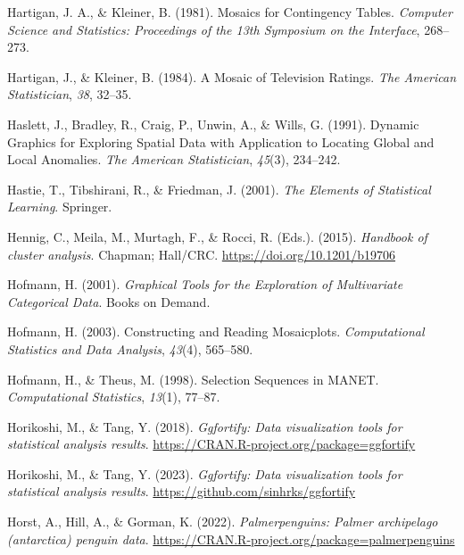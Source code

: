 \documentclass[
  letterpaper,
]{krantz}
\newlength{\cslhangindent}
\newlength{\cslentryspacingunit} %
\newenvironment{CSLReferences}[2] %
 {%
  \setlength{\parindent}{0pt}
  \ifodd #1
  \let\oldpar\par
  \def\par{\hangindent=\cslhangindent\oldpar}
  \fi
  \setlength{\parskip}{#2\cslentryspacingunit}
 }%
 {}
\begin{document}
\begin{CSLReferences}{1}{0}
\leavevmode{}%
Hartigan, J. A., \& Kleiner, B. (1981). Mosaics for {C}ontingency
{T}ables. \emph{Computer Science and Statistics: Proceedings of the 13th
Symposium on the Interface}, 268--273.

\leavevmode{}%
Hartigan, J., \& Kleiner, B. (1984). A {M}osaic of {T}elevision
{R}atings. \emph{The American Statistician}, \emph{38}, 32--35.

\leavevmode{}%
Haslett, J., Bradley, R., Craig, P., Unwin, A., \& Wills, G. (1991).
{D}ynamic {G}raphics for {E}xploring {S}patial {D}ata with {A}pplication
to {L}ocating {G}lobal and {L}ocal {A}nomalies. \emph{The American
Statistician}, \emph{45}(3), 234--242.

\leavevmode{}%
Hastie, T., Tibshirani, R., \& Friedman, J. (2001). \emph{The {E}lements
of {S}tatistical {L}earning}. Springer.

\leavevmode{}%
Hennig, C., Meila, M., Murtagh, F., \& Rocci, R. (Eds.). (2015).
\emph{Handbook of cluster analysis}. Chapman; Hall/{CRC}.
\url{https://doi.org/10.1201/b19706}

\leavevmode{}%
Hofmann, H. (2001). \emph{Graphical {T}ools for the {E}xploration of
{M}ultivariate {C}ategorical {D}ata}. Books on Demand.

\leavevmode{}%
Hofmann, H. (2003). Constructing and {R}eading {M}osaicplots.
\emph{Computational Statistics and Data Analysis}, \emph{43}(4),
565--580.

\leavevmode{}%
Hofmann, H., \& Theus, M. (1998). Selection {S}equences in {MANET}.
\emph{Computational Statistics}, \emph{13}(1), 77--87.

\leavevmode{}%
Horikoshi, M., \& Tang, Y. (2018). \emph{Ggfortify: Data visualization
tools for statistical analysis results}.
\url{https://CRAN.R-project.org/package=ggfortify}

\leavevmode{}%
Horikoshi, M., \& Tang, Y. (2023). \emph{Ggfortify: Data visualization
tools for statistical analysis results}.
\url{https://github.com/sinhrks/ggfortify}

\leavevmode{}%
Horst, A., Hill, A., \& Gorman, K. (2022). \emph{Palmerpenguins: Palmer
archipelago (antarctica) penguin data}.
\url{https://CRAN.R-project.org/package=palmerpenguins}


\end{CSLReferences}
\end{document}
